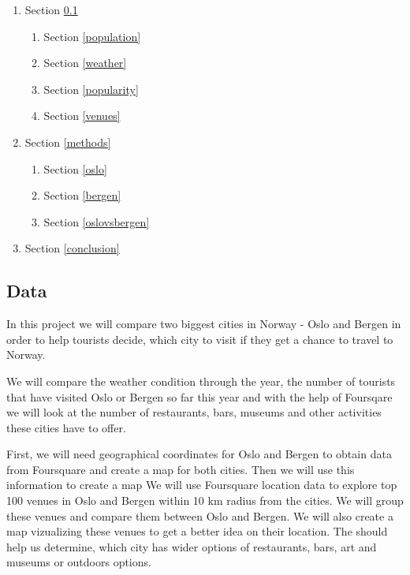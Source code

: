 \documentclass[11pt]{article}
\providecommand{\tightlist}{%
      \setlength{\itemsep}{0pt}\setlength{\parskip}{0pt}}
\begin{document}
\begin{enumerate}
\def\labelenumi{\arabic{enumi}.}
\tightlist
\item
  Section \ref{data}

  \begin{enumerate}
  \def\labelenumii{\arabic{enumii}.}
  \tightlist
  \item
    Section \ref{population}
  \item
    Section \ref{weather}
  \item
    Section \ref{popularity}
  \item
    Section \ref{venues}
  \end{enumerate}
\item
  Section \ref{methods}

  \begin{enumerate}
  \def\labelenumii{\arabic{enumii}.}
  \tightlist
  \item
    Section \ref{oslo}
  \item
    Section \ref{bergen}
  \item
    Section \ref{oslovsbergen}
  \end{enumerate}
\item
  Section \ref{conclusion}
\end{enumerate}

    \hypertarget{data}{%
\subsection{Data }\label{data}}

In this project we will compare two biggest cities in Norway - Oslo and
Bergen in order to help tourists decide, which city to visit if they get
a chance to travel to Norway.

We will compare the weather condition through the year, the number of
tourists that have visited Oslo or Bergen so far this year and with the
help of Foursqare we will look at the number of restaurants, bars,
museums and other activities these cities have to offer.

First, we will need geographical coordinates for Oslo and Bergen to
obtain data from Foursquare and create a map for both cities. Then we
will use this information to create a map We will use Foursquare
location data to explore top 100 venues in Oslo and Bergen within 10 km
radius from the cities. We will group these venues and compare them
between Oslo and Bergen. We will also create a map vizualizing these
venues to get a better idea on their location. The should help us
determine, which city has wider options of restaurants, bars, art and
museums or outdoors options.
\end{document}
